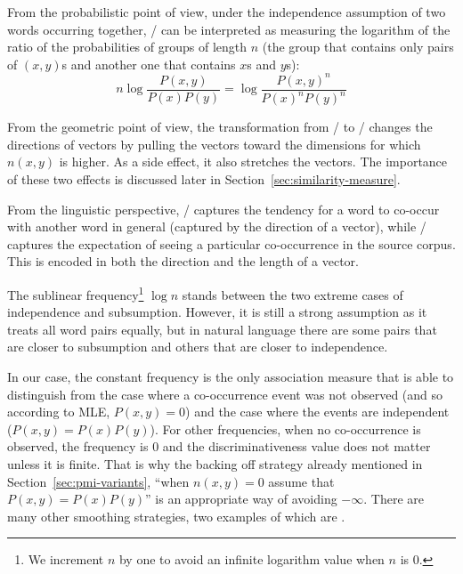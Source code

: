 From the probabilistic point of view, under the independence assumption of two words occurring together, \NPMI/ can be interpreted as measuring the logarithm of the ratio of the probabilities of groups of length $n$ (the group that contains only pairs of $(x,y)$s and another one that contains $x$s and $y$s):
%
\begin{equation*}
  n\log\frac{P(x, y)}{P(x)P(y)} = \log\frac{P(x, y)^{n}}{P(x)^{n}P(y)^{n}}
\end{equation*}
%
%
%

From the geometric point of view, the transformation from \PMI/ to \NPMI/ changes the directions of vectors by pulling the vectors toward the dimensions for which $n(x, y)$ is higher. As a side effect, it also stretches the vectors. The importance of these two effects is discussed later in Section~\ref{sec:similarity-measure}.

From the linguistic perspective, \PMI/ captures the tendency for a word to co-occur with another word in general (captured by the direction of a vector), while \NPMI/ captures the expectation of seeing a particular co-occurrence in the source corpus. This is encoded in both the direction and the length of a vector.

The sublinear frequency\footnote{We increment $n$ by one to avoid an infinite logarithm value when $n$ is 0.} $\log n$ stands between the two extreme cases of independence and subsumption. However, it is still a strong assumption as it treats all word pairs equally, but in natural language there are some pairs that are closer to subsumption and others that are closer to independence.

In our case, the constant frequency is the only association measure that is able to distinguish from the case where a co-occurrence event was not observed (and so according to MLE, $P(x, y)= 0$) and the case where the events are independent ($P(x, y) = P(x)P(y)$). For other frequencies, when no co-occurrence is observed, the frequency is 0 and the discriminativeness value does not matter unless it is finite. That is why the backing off strategy already mentioned in Section~\ref{sec:pmi-variants}, ``when $n(x, y) = 0$ assume that $P(x, y) = P(x)P(y)$'' is an appropriate way of avoiding $-\infty$. There are many other smoothing strategies, two examples of which are .

